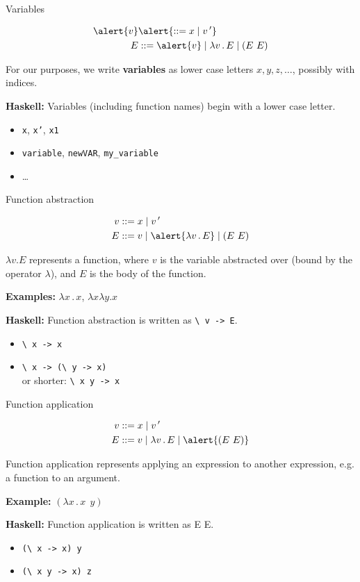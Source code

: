 \documentclass[xcolor=dvipsnames]{beamer}
\begin{document}
\begin{frame}[t]{Variables}

\begin{align*}
\alert{v} & \alert{::= x \mid v\,'} \\
E & ::= \alert{v} \mid \lambda v\,.\,E \mid (E\ E)
\end{align*}

For our purposes, we write {\bf variables} as lower case letters 
$x,y,z,\ldots$, possibly with indices.

{\bf Haskell:} Variables (including function names) begin with a lower case letter.
\begin{itemize}
\item {\tt x}, {\tt x'}, {\tt x1} 
\item {\tt variable}, {\tt newVAR}, {\tt my\_variable}
\item \ldots
\end{itemize}
\end{frame}


\begin{frame}[t,fragile]{Function abstraction}

\begin{align*}
v & ::= x \mid v\,' \\
E & ::= v \mid \alert{\lambda v\,.\,E} \mid (E\ E)
\end{align*}

\alert{$\lambda v.E$} represents a function, where 
$v$ is the variable abstracted over 
(bound by the operator $\lambda$), 
and $E$ is the body of the function. 

{\bf Examples:} $\lambda x\,.\,x$, $\lambda x\lambda y.x$ %

{\bf Haskell:} 
Function abstraction is written as {\verb^\ v -> E^}.
\begin{itemize}
\item {\verb^\ x -> x^}
\item {\verb^\ x -> (\ y -> x)^} \\ 
or shorter: \verb^\ x y -> x^
\end{itemize} 
\end{frame}

\begin{frame}[t,fragile]{Function application}

\begin{align*}
v & ::= x \mid v\,' \\
E & ::= v \mid \lambda v\,.\,E \mid \alert{(E\ E)}
\end{align*}

Function application represents applying an expression to another expression, 
e.g. a function to an argument. 

{\bf Example:} $(\lambda x\,.\,x\ \ y)$ 

{\bf Haskell:} 
Function application is written as {E E}.
\begin{itemize}
\item {\verb^(\ x -> x) y^}
\item {\verb^(\ x y -> x) z^}
\end{itemize}
\end{frame}
\end{document}
